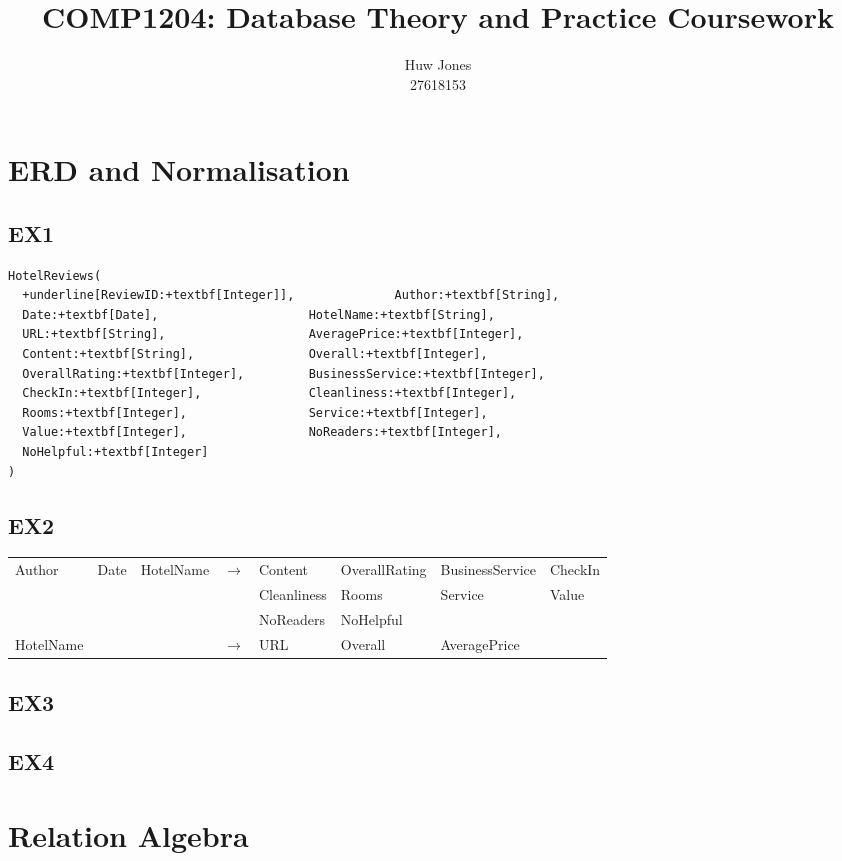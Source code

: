 \documentclass[a4paper]{article}
\author{Huw Jones \\27618153}
\title{COMP1204: Database Theory and Practice Coursework}
\begin{document}
\maketitle

\section{ERD and Normalisation}
\subsection{EX1}
\begin{Verbatim}[commandchars=+\[\]]
HotelReviews(
  +underline[ReviewID:+textbf[Integer]],              Author:+textbf[String],
  Date:+textbf[Date],                     HotelName:+textbf[String],
  URL:+textbf[String],                    AveragePrice:+textbf[Integer],
  Content:+textbf[String],                Overall:+textbf[Integer],
  OverallRating:+textbf[Integer],         BusinessService:+textbf[Integer],
  CheckIn:+textbf[Integer],               Cleanliness:+textbf[Integer],
  Rooms:+textbf[Integer],                 Service:+textbf[Integer],
  Value:+textbf[Integer],                 NoReaders:+textbf[Integer],
  NoHelpful:+textbf[Integer]
)
\end{Verbatim}

\subsection{EX2}
\begin{tabular}{l l l c l l l l}
Author & Date & HotelName & $\to$ & Content & OverallRating & BusinessService & CheckIn \\
&&&& Cleanliness & Rooms & Service & Value \\
&&&& NoReaders & NoHelpful & & \\
HotelName & & & $\to$ & URL & Overall & AveragePrice & \\
\end{tabular}

\subsection{EX3}
\subsection{EX4}

\section{Relation Algebra}
\end{document}
